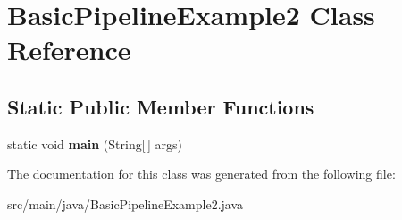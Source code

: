 \hypertarget{classBasicPipelineExample2}{}\section{Basic\+Pipeline\+Example2 Class Reference}
\label{classBasicPipelineExample2}
\subsection*{Static Public Member Functions}
\begin{DoxyCompactItemize}
\item 
\mbox{\label{classBasicPipelineExample2_a3445739bb09fb5009460fb6161f83ff4}} 
static void {\bfseries main} (String\mbox{[}$\,$\mbox{]} args)
\end{DoxyCompactItemize}


The documentation for this class was generated from the following file\+:\begin{DoxyCompactItemize}
\item 
src/main/java/Basic\+Pipeline\+Example2.\+java\end{DoxyCompactItemize}
